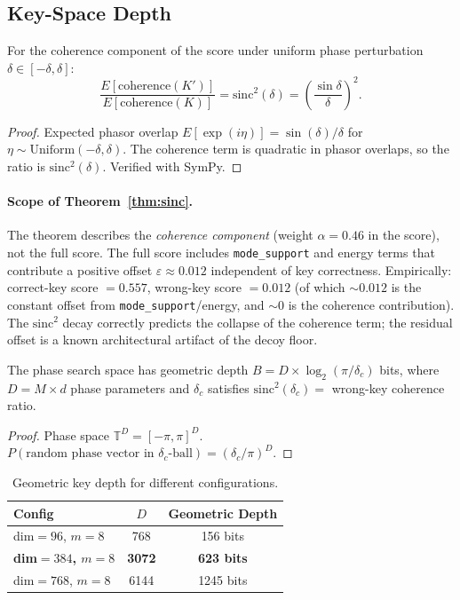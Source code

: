 \documentclass{article}
\begin{document}
\subsection{Key-Space Depth}

\begin{theorem}
\label{thm:sinc}
For the coherence component of the score under uniform phase perturbation $\delta \in [-\delta, \delta]$:
\[
  \frac{E[\mathrm{coherence}(K')]}{E[\mathrm{coherence}(K)]} = \mathrm{sinc}^2(\delta) = \left(\frac{\sin\delta}{\delta}\right)^{\!2}.
\]
\end{theorem}

\begin{proof}
Expected phasor overlap $E[\exp(i\eta)] = \sin(\delta)/\delta$ for $\eta \sim \mathrm{Uniform}(-\delta,\delta)$.
The coherence term is quadratic in phasor overlaps, so the ratio is $\mathrm{sinc}^2(\delta)$.
Verified with SymPy.
\end{proof}

\paragraph{Scope of Theorem~\ref{thm:sinc}.}
The theorem describes the \emph{coherence component} (weight $\alpha{=}0.46$ in the score), not the full score.
The full score includes \texttt{mode\_support} and energy terms that contribute a positive offset $\varepsilon \approx 0.012$ independent of key correctness.
Empirically: correct-key score $= 0.557$, wrong-key score $= 0.012$ (of which ${\sim}0.012$ is the constant offset from \texttt{mode\_support}/energy, and ${\sim}0$ is the coherence contribution).
The $\mathrm{sinc}^2$ decay correctly predicts the collapse of the coherence term; the residual offset is a known architectural artifact of the decoy floor.

\begin{theorem}
\label{thm:keydepth}
The phase search space has geometric depth $B = D \times \log_2(\pi/\delta_c)$ bits, where $D = M \times d$ phase parameters and $\delta_c$ satisfies $\mathrm{sinc}^2(\delta_c) = $ wrong-key coherence ratio.
\end{theorem}

\begin{proof}
Phase space $\mathbb{T}^D = [-\pi,\pi]^D$.
$P(\text{random phase vector in } \delta_c\text{-ball}) = (\delta_c/\pi)^D$.
\end{proof}

\begin{table}[htbp]
\centering
\caption{Geometric key depth for different configurations.}
\label{tab:keydepth}
\begin{tabular}{@{}lcc@{}}
\toprule
\textbf{Config} & $D$ & \textbf{Geometric Depth} \\
\midrule
dim${}=96$, $m{=}8$ & 768 & 156 bits \\
\textbf{dim${}=384$, $m{=}8$} & \textbf{3072} & \textbf{623 bits} \\
dim${}=768$, $m{=}8$ & 6144 & 1245 bits \\
\bottomrule
\end{tabular}
\end{table}
\end{document}
